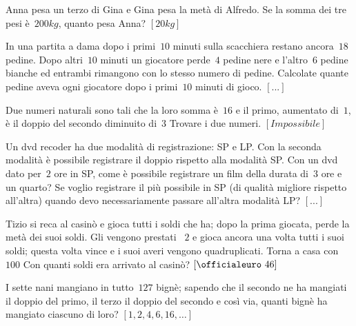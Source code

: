 \begin{multicols}{2}
\begin{esercizio}[\Ast]
\label{ese:14.51}
Anna pesa un terzo di Gina e Gina pesa la metà di Alfredo. Se la somma dei tre 
pesi è~$200\unit{kg}$, quanto pesa Anna? \hfill $\left[20\unit{kg}\right]$
\end{esercizio}

\begin{esercizio}
\label{ese:14.52}
In una partita a dama dopo i primi~$10$ minuti sulla scacchiera restano 
ancora~$18$ pedine. Dopo altri~$10$ minuti un giocatore perde~$4$ pedine nere e 
l'altro~$6$ pedine bianche ed entrambi rimangono con lo stesso numero di 
pedine. 
Calcolate quante pedine aveva ogni giocatore dopo i primi~$10$ minuti di gioco.
 \hfill $\left[...\right]$
\end{esercizio}

\begin{esercizio}[\Ast]
\label{ese:14.53}
Due numeri naturali sono tali che la loro somma è~$16$ e il primo, aumentato 
di~$1$, è il doppio del secondo diminuito di~$3$ Trovare i due numeri.
 \hfill $\left[Impossibile\right]$
\end{esercizio}

\begin{esercizio}
\label{ese:14.54}
Un dvd recoder ha due modalità di registrazione: SP e LP. Con la seconda 
modalità è possibile registrare il doppio rispetto alla modalità SP. Con un dvd 
dato per~$2$ ore in SP, come è possibile registrare un film della durata di~$3$ 
ore e un quarto? Se voglio registrare il più possibile in SP (di qualità 
migliore rispetto all'altra) quando devo necessariamente passare all'altra 
modalità LP? \hfill $\left[...\right]$
\end{esercizio}

\begin{esercizio}[\Ast]
\label{ese:14.55}
Tizio si reca al casinò e gioca tutti i soldi che ha; dopo la prima giocata, 
perde la metà dei suoi soldi. Gli vengono prestati \officialeuro~$2$ e gioca 
ancora una volta tutti i suoi soldi; questa volta vince e i suoi averi vengono 
quadruplicati. Torna a casa con \officialeuro~$100$ Con quanti soldi era 
arrivato al casinò? \hfill $\left[\officialeuro~46\right]$
\end{esercizio}

\begin{esercizio}[\Ast]
\label{ese:14.56}
I sette nani mangiano in tutto~$127$ bignè; sapendo che il secondo ne ha 
mangiati il doppio del primo, il terzo il doppio del secondo e così via, quanti 
bignè ha mangiato ciascuno di loro? \hfill $\left[1,2,4,6,16,\ldots\right]$
\end{esercizio}


\end{multicols}
